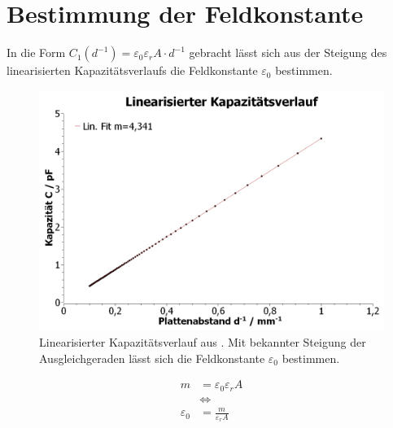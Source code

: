 \section{Bestimmung der Feldkonstante}
In die Form \(C_1(d^{-1}) = \varepsilon_0\varepsilon_r A \cdot d^{-1}\) gebracht lässt sich aus der Steigung des
linearisierten Kapazitätsverlaufs die Feldkonstante \(\varepsilon_0\) bestimmen.
\begin{figure}[h]
    \centering
    \includegraphics[width=.8\textwidth]{scidavis/linearisierter_kapazitaetsverlauf.jpeg}
    \caption[Linearisierter Kapazitätsverlauf]{Linearisierter Kapazitätsverlauf aus . Mit bekannter Steigung der Ausgleichgeraden lässt sich die Feldkonstante \(\varepsilon_0\) bestimmen.}
    \label{fig:lin_kapVerlauf}
\end{figure}
\begin{align}
    m &= \varepsilon_0\varepsilon_r A \nonumber \\
    &\Leftrightarrow \nonumber \\
    \varepsilon_0 &= \frac{m}{\varepsilon_r A}
    \label{eq:e0}
\end{align}
%
%
